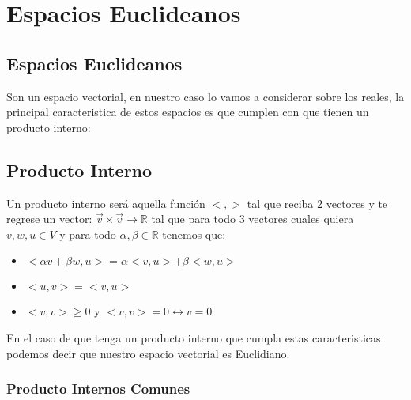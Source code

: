 \documentclass[12pt]{report}							    %
\begin{document}
\chapter{Espacios Euclideanos}
    \clearpage

    \section{Espacios Euclideanos}
        Son un espacio vectorial, en nuestro caso lo vamos a considerar sobre los reales, la principal caracteristica de estos espacios es que cumplen con que tienen un producto interno:


    \clearpage
    \section{Producto Interno}
        Un producto interno será aquella función $<,>$ tal que reciba 2 vectores y
        te regrese un vector: $\vec v \times \vec v \to \mathbb{R}$ tal que para
        todo 3 vectores cuales quiera $v, w, u \in V$ y para todo
        $\alpha , \beta \in  \mathbb{R} $ tenemos que:

        \begin{itemize}
            \item $<\alpha v + \beta w, u> = \alpha <v, u> + \beta <w, u>$
            \item $<u, v> = <v, u>$
            \item $<v, v> \geq 0 $ y $ <v, v> = 0 \leftrightarrow v = 0$
        \end{itemize}

        En el caso de que tenga un producto interno que cumpla estas caracteristicas
        podemos decir que nuestro espacio vectorial es Euclidiano.

        \subsection{Producto Internos Comunes}
\end{document}
